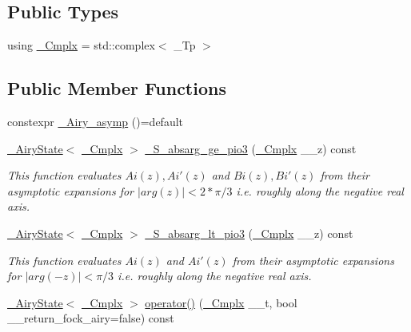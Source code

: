 \subsection*{Public Types}
\begin{DoxyCompactItemize}
\item 
using \hyperlink{classstd_1_1____detail_1_1__Airy__asymp_ae28f102423d34e78502ab6da42d67f50}{\+\_\+\+Cmplx} = std\+::complex$<$ \+\_\+\+Tp $>$
\end{DoxyCompactItemize}
\subsection*{Public Member Functions}
\begin{DoxyCompactItemize}
\item 
constexpr \hyperlink{classstd_1_1____detail_1_1__Airy__asymp_a93f2010a2c48be2f38445420ba019a52}{\+\_\+\+Airy\+\_\+asymp} ()=default
\item 
\hyperlink{structstd_1_1____detail_1_1__AiryState}{\+\_\+\+Airy\+State}$<$ \hyperlink{classstd_1_1____detail_1_1__Airy__asymp_ae28f102423d34e78502ab6da42d67f50}{\+\_\+\+Cmplx} $>$ \hyperlink{classstd_1_1____detail_1_1__Airy__asymp_ac3429a56fa955a3b8a71d450fd9662a6}{\+\_\+\+S\+\_\+absarg\+\_\+ge\+\_\+pio3} (\hyperlink{classstd_1_1____detail_1_1__Airy__asymp_ae28f102423d34e78502ab6da42d67f50}{\+\_\+\+Cmplx} \+\_\+\+\_\+z) const
\begin{DoxyCompactList}\small\item\em This function evaluates $ Ai(z), Ai'(z) $ and $ Bi(z), Bi'(z) $ from their asymptotic expansions for $ |arg(z)| < 2*\pi/3 $ i.\+e. roughly along the negative real axis. \end{DoxyCompactList}\item 
\hyperlink{structstd_1_1____detail_1_1__AiryState}{\+\_\+\+Airy\+State}$<$ \hyperlink{classstd_1_1____detail_1_1__Airy__asymp_ae28f102423d34e78502ab6da42d67f50}{\+\_\+\+Cmplx} $>$ \hyperlink{classstd_1_1____detail_1_1__Airy__asymp_a64bce3ed154b3268944ae20f324d64cd}{\+\_\+\+S\+\_\+absarg\+\_\+lt\+\_\+pio3} (\hyperlink{classstd_1_1____detail_1_1__Airy__asymp_ae28f102423d34e78502ab6da42d67f50}{\+\_\+\+Cmplx} \+\_\+\+\_\+z) const
\begin{DoxyCompactList}\small\item\em This function evaluates $ Ai(z) $ and $ Ai'(z) $ from their asymptotic expansions for $ |arg(-z)| < \pi/3 $ i.\+e. roughly along the negative real axis. \end{DoxyCompactList}\item 
\hyperlink{structstd_1_1____detail_1_1__AiryState}{\+\_\+\+Airy\+State}$<$ \hyperlink{classstd_1_1____detail_1_1__Airy__asymp_ae28f102423d34e78502ab6da42d67f50}{\+\_\+\+Cmplx} $>$ \hyperlink{classstd_1_1____detail_1_1__Airy__asymp_a79ba1c14d03fad8369477baf39c62874}{operator()} (\hyperlink{classstd_1_1____detail_1_1__Airy__asymp_ae28f102423d34e78502ab6da42d67f50}{\+\_\+\+Cmplx} \+\_\+\+\_\+t, bool \+\_\+\+\_\+return\+\_\+fock\+\_\+airy=false) const
\end{DoxyCompactItemize}


